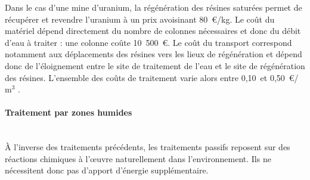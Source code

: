 \documentclass{article}
\begin{document}


Dans le cas d’une mine d’uranium, la régénération des résines saturées permet de récupérer et revendre l’uranium à un prix avoisinant 80~\euro{}/kg. Le coût du matériel dépend directement du nombre de colonnes nécessaires et donc du débit d’eau à traiter : une colonne coûte 10~500~\euro{}. Le coût du transport correspond notamment aux déplacements des résines vers les lieux de régénération et dépend donc de l’éloignement entre le site de traitement de l’eau et le site de régénération des résines. L’ensemble des coûts de traitement varie alors entre 0,10~et 0,50~\euro{}/$\text{m}^3$ \cite{schick_informations_2020}.

\paragraph{Traitement par zones humides \\ \\}

\`A l’inverse des traitements précédents, les traitements passifs reposent sur des réactions chimiques à l’œuvre naturellement dans l’environnement. Ils ne nécessitent donc pas d’apport d’énergie supplémentaire. 
\end{document}
